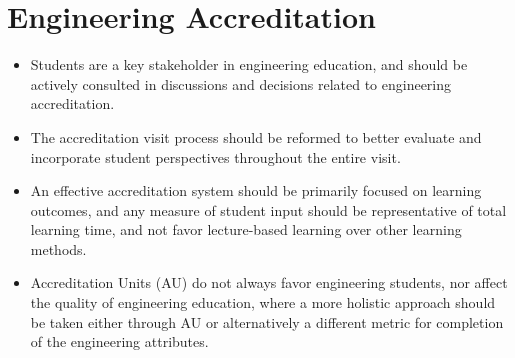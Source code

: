 \section{Engineering Accreditation}\label{engineering-accreditation}



\begin{itemize}
 \item Students are a key stakeholder in engineering education, and should be actively consulted in discussions and decisions related to engineering accreditation.
 \item The accreditation visit process should be reformed to better evaluate and incorporate student perspectives throughout the entire visit.
 \item An effective accreditation system should be primarily focused on learning outcomes, and any measure of student input should be representative of total learning time, and not favor lecture-based learning over other learning methods.
 \item Accreditation Units (AU) do not always favor engineering students, nor affect the quality of engineering education, where a more holistic approach should be taken either through AU or alternatively a different metric for completion of the engineering attributes.
\end{itemize}

